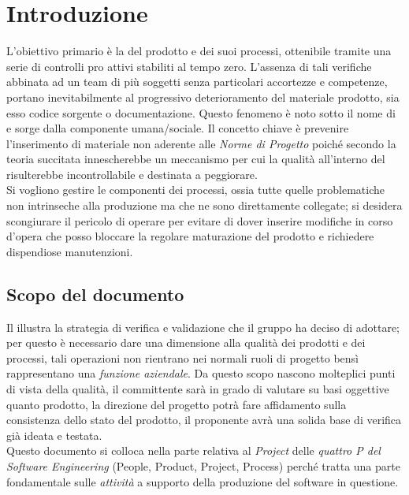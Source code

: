 \section{Introduzione}
 L'obiettivo primario è la  del prodotto e dei suoi processi, ottenibile tramite una serie di controlli pro attivi stabiliti al tempo zero. L'assenza di tali verifiche abbinata ad un team di più soggetti senza particolari accortezze e competenze, portano inevitabilmente al progressivo deterioramento del materiale prodotto, sia esso codice sorgente o documentazione. Questo fenomeno è noto sotto il nome di  e sorge dalla componente umana/sociale. Il concetto chiave è prevenire l'inserimento di materiale non aderente alle \emph{Norme di Progetto} poiché secondo la teoria succitata innescherebbe un meccanismo per cui la qualità all'interno del  risulterebbe incontrollabile e destinata a peggiorare. \\ %
Si vogliono gestire le componenti  dei processi, ossia tutte quelle problematiche non intrinseche alla produzione ma che ne sono direttamente collegate; si desidera scongiurare il pericolo di operare  per evitare di dover inserire modifiche in corso d'opera che posso bloccare la regolare maturazione del prodotto e richiedere dispendiose manutenzioni.

\subsection{Scopo del documento}
Il \DocTitle  illustra la strategia di verifica e validazione che il gruppo \groupName ha deciso di adottare; per questo è necessario dare una dimensione alla qualità dei prodotti e dei processi, tali operazioni non rientrano nei normali ruoli di progetto bensì rappresentano una \emph{funzione aziendale}. Da questo scopo nascono molteplici punti di vista della qualità, il committente sarà in grado di valutare su basi oggettive quanto prodotto, la direzione del progetto potrà fare affidamento sulla consistenza dello stato del prodotto, il proponente avrà una solida base di verifica già ideata e testata. \\ Questo documento si colloca nella parte relativa al \emph{Project} delle \emph{quattro P del Software Engineering} (People, Product, Project, Process) perché tratta una parte fondamentale sulle \emph{attività} a supporto della produzione del software in questione.

